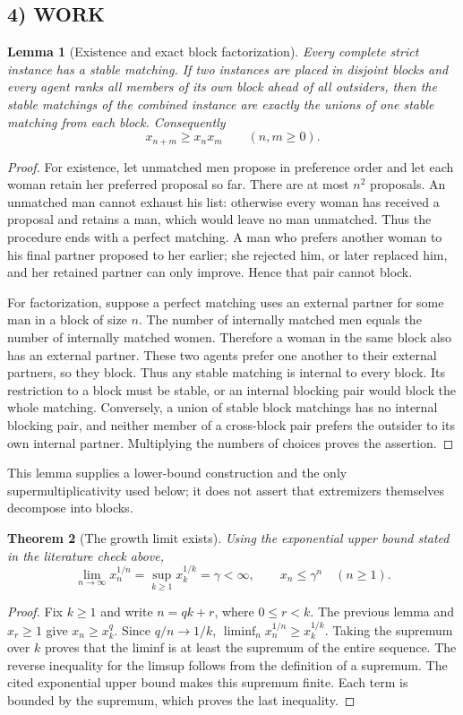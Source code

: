 \documentclass[11pt,a4paper]{article}
\newtheorem{theorem}{Theorem}[section]
\newtheorem{lemma}[theorem]{Lemma}
\theoremstyle{definition}
\theoremstyle{remark}
\begin{document}
\subsection*{4) WORK}
\begin{lemma}[Existence and exact block factorization]
Every complete strict instance has a stable matching. If two instances are placed
in disjoint blocks and every agent ranks all members of its own block ahead of
all outsiders, then the stable matchings of the combined instance are exactly the
unions of one stable matching from each block. Consequently
\[
 x_{n+m}\geq x_nx_m\qquad(n,m\geq0).
\]
\end{lemma}
\begin{proof}
For existence, let unmatched men propose in preference order and let each woman
retain her preferred proposal so far. There are at most $n^2$ proposals. An unmatched
man cannot exhaust his list: otherwise every woman has received a proposal and
retains a man, which would leave no man unmatched. Thus the procedure ends with a
perfect matching. A man who prefers another woman to his final partner proposed
to her earlier; she rejected him, or later replaced him, and her retained partner
can only improve. Hence that pair cannot block.

For factorization, suppose a perfect matching uses an external partner for some
man in a block of size $n$. The number of internally matched men equals the number
of internally matched women. Therefore a woman in the same block also has an
external partner. These two agents prefer one another to their external partners,
so they block. Thus any stable matching is internal to every block. Its restriction
to a block must be stable, or an internal blocking pair would block the whole
matching. Conversely, a union of stable block matchings has no internal blocking
pair, and neither member of a cross-block pair prefers the outsider to its own
internal partner. Multiplying the numbers of choices proves the assertion.
\end{proof}
This lemma supplies a lower-bound construction and the only supermultiplicativity
used below; it does not assert that extremizers themselves decompose into blocks.

\begin{theorem}[The growth limit exists]
Using the exponential upper bound stated in the literature check above,
\[
 \lim_{n\to\infty}x_n^{1/n}=\sup_{k\geq1}x_k^{1/k}=\gamma<\infty,
 \qquad x_n\leq\gamma^n\quad(n\geq1).
\]
\end{theorem}
\begin{proof}
Fix $k\geq1$ and write $n=qk+r$, where $0\leq r<k$. The previous lemma and
$x_r\geq1$ give $x_n\geq x_k^q$. Since $q/n\to1/k$,
$\liminf_n x_n^{1/n}\geq x_k^{1/k}$. Taking the supremum over $k$ proves that the
liminf is at least the supremum of the entire sequence. The reverse inequality
for the limsup follows from the definition of a supremum. The cited exponential
upper bound makes this supremum finite. Each term is bounded by the supremum,
which proves the last inequality.
\end{proof}
\end{document}
